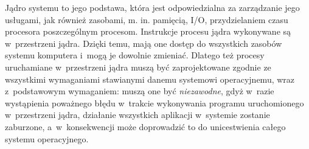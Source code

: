 \documentclass[12pt]{mwart}
\begin{document}
\par
%
\indent
	Jądro systemu to jego podstawa, która jest odpowiedzialna za zarządzanie jego usługami, jak również zasobami, m. in. pamięcią, I/O,
	przydzielaniem czasu procesora poszczególnym procesom. Instrukcje procesu jądra wykonywane są w~przestrzeni jądra. Dzięki temu,
	mają one dostęp do wszystkich zasobów systemu komputera i~mogą je dowolnie zmieniać. Dlatego też procesy uruchamiane w~przestrzeni
	jądra muszą być zaprojektowane zgodnie ze wszystkimi wymaganiami stawianymi danemu systemowi operacyjnemu, wraz z~podstawowym wymaganiem:
	muszą one być \emph{niezawodne}, gdyż w~razie wystąpienia poważnego błędu w~trakcie wykonywania programu uruchomionego w~przestrzeni jądra,
	działanie wszystkich aplikacji w~systemie zostanie zaburzone, a~w~konsekwencji może doprowadzić to do unicestwienia całego systemu operacyjnego.
\par
%
\end{document}
